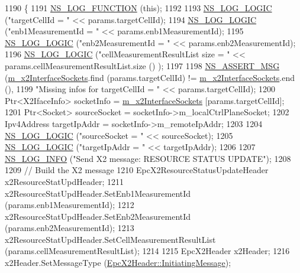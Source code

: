 \begin{DoxyCode}
1190 \{
1191   \hyperlink{log-macros-disabled_8h_a90b90d5bad1f39cb1b64923ea94c0761}{NS\_LOG\_FUNCTION} (\textcolor{keyword}{this});
1192 
1193   \hyperlink{group__logging_ga88acd260151caf2db9c0fc84997f45ce}{NS\_LOG\_LOGIC} (\textcolor{stringliteral}{"targetCellId = "} << params.targetCellId);
1194   \hyperlink{group__logging_ga88acd260151caf2db9c0fc84997f45ce}{NS\_LOG\_LOGIC} (\textcolor{stringliteral}{"enb1MeasurementId = "} << params.enb1MeasurementId);
1195   \hyperlink{group__logging_ga88acd260151caf2db9c0fc84997f45ce}{NS\_LOG\_LOGIC} (\textcolor{stringliteral}{"enb2MeasurementId = "} << params.enb2MeasurementId);
1196   \hyperlink{group__logging_ga88acd260151caf2db9c0fc84997f45ce}{NS\_LOG\_LOGIC} (\textcolor{stringliteral}{"cellMeasurementResultList size = "} << params.cellMeasurementResultList.size ()
      );
1197 
1198   \hyperlink{assert_8h_aff5ece9066c74e681e74999856f08539}{NS\_ASSERT\_MSG} (\hyperlink{classns3_1_1EpcX2_a0665276228b9b99a52ef6d5e9bdb306d}{m\_x2InterfaceSockets}.find (params.targetCellId) != 
      \hyperlink{classns3_1_1EpcX2_a0665276228b9b99a52ef6d5e9bdb306d}{m\_x2InterfaceSockets}.end (),
1199                  \textcolor{stringliteral}{"Missing infos for targetCellId = "} << params.targetCellId);
1200   Ptr<X2IfaceInfo> socketInfo = \hyperlink{classns3_1_1EpcX2_a0665276228b9b99a52ef6d5e9bdb306d}{m\_x2InterfaceSockets} [params.targetCellId];
1201   Ptr<Socket> sourceSocket = socketInfo->m\_localCtrlPlaneSocket;
1202   Ipv4Address targetIpAddr = socketInfo->m\_remoteIpAddr;
1203 
1204   \hyperlink{group__logging_ga88acd260151caf2db9c0fc84997f45ce}{NS\_LOG\_LOGIC} (\textcolor{stringliteral}{"sourceSocket = "} << sourceSocket);
1205   \hyperlink{group__logging_ga88acd260151caf2db9c0fc84997f45ce}{NS\_LOG\_LOGIC} (\textcolor{stringliteral}{"targetIpAddr = "} << targetIpAddr);
1206 
1207   \hyperlink{group__logging_gafbd73ee2cf9f26b319f49086d8e860fb}{NS\_LOG\_INFO} (\textcolor{stringliteral}{"Send X2 message: RESOURCE STATUS UPDATE"});
1208 
1209   \textcolor{comment}{// Build the X2 message}
1210   EpcX2ResourceStatusUpdateHeader x2ResourceStatUpdHeader;
1211   x2ResourceStatUpdHeader.SetEnb1MeasurementId (params.enb1MeasurementId);
1212   x2ResourceStatUpdHeader.SetEnb2MeasurementId (params.enb2MeasurementId);
1213   x2ResourceStatUpdHeader.SetCellMeasurementResultList (params.cellMeasurementResultList);
1214 
1215   EpcX2Header x2Header;
1216   x2Header.SetMessageType (\hyperlink{classns3_1_1EpcX2Header_a0e69b043a20eaee4c570f223f4eca715a5761e50c3c1918a44e3a5ebc86f17435}{EpcX2Header::InitiatingMessage});

\end{DoxyCode}
